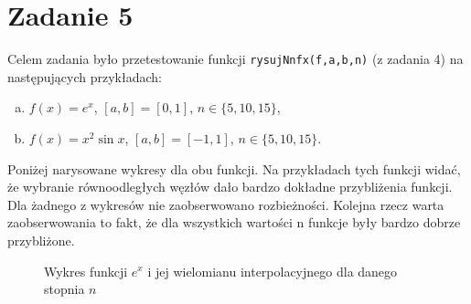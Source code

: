 \documentclass[]{article}
\begin{document}
	
	\section*{Zadanie 5}
	Celem zadania było przetestowanie funkcji \texttt{rysujNnfx(f,a,b,n)} (z zadania 4) na następujących przykładach:
	\begin{enumerate}[(a)]
		\item $f(x) = e^x$, $[a, b] = [0,1]$, $n \in \{5,10,15\}$,
		\item $f(x) = x^2\sin{x}$, $[a, b] = [-1,1]$, $n \in \{5,10,15\}$.
	\end{enumerate}
	Poniżej narysowane wykresy dla obu funkcji. Na przykładach tych funkcji widać, że wybranie równoodległych węzłów dało bardzo dokładne przybliżenia funkcji. Dla żadnego z wykresów nie zaobserwowano rozbieżności. Kolejna rzecz warta zaobserwowania to fakt, że dla wszystkich wartości n funkcje były bardzo dobrze przybliżone.
	
		\begin{figure}[!htbp]
	\centering
	 \hfill
	 \hfill
	 \hfill
	\caption*{Wykres funkcji $e^{x}$ i jej wielomianu interpolacyjnego dla danego stopnia $n$}
\end{figure}		
\end{document}
